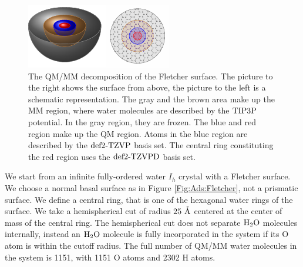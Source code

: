\documentclass[8.5pt,twoside,twocolumn]{article}
\renewcommand{\Ang}{\mathring{\te{A}}}
\theoremstyle{standard}
\begin{document}
\begin{figure}[ht]
\centering
\includegraphics[width=\textwidth]{TikzPics/TikzCreation/SurfaceQMMM/SurfaceQMMMAside.pdf}
\newline
\caption{The QM/MM decomposition of the Fletcher surface. The picture to the right shows the surface from above,
the picture to the left is a schematic representation. The gray and the brown area make up the MM region,
where water molecules are described by the $\text{TIP3P}$ potential. In the gray region, they are frozen. 
The blue and red region make up the QM region. Atoms in the blue region are described by the
$\text{def2-TZVP}$ basis set. The central ring constituting the red region uses the $\text{def2-TZVPD}$ basis set.}
\label{Fig:Ads:QMMM}
\end{figure}

We start from an infinite fully-ordered water $I_h$ crystal with a Fletcher
surface. We choose a normal basal surface as in Figure \ref{Fig:Ads:Fletcher},
not a prismatic surface. We define a central ring, that is one of the hexagonal
water rings of the surface. We take a hemispherical cut of radius $25~\Ang$
centered at the center of mass of the central ring. The hemispherical cut does
not separate $\text H _2 \text O$ molecules internally, instead an $\text H _2 \text O$ molecule is fully
incorporated in the system if its O atom is within the cutoff radius. The full
number of QM/MM water molecules in the system is 1151, with 1151 O atoms and
2302 H atoms.
\end{document}
